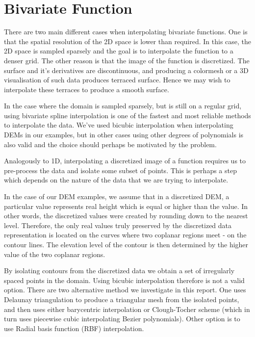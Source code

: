 \documentclass[a4paper,10pt]{report}
\begin{document}
\section{Bivariate Function}
There are two main different cases when interpolating bivariate functions. One is that the spatial resolution of the 2D space is lower than required. In this case, the 2D space is sampled sparsely and the goal is to interpolate the function to a denser grid. The other reason is that the image of the function is discretized. The surface and it's derivatives are discontinuous, and producing a colormesh or a 3D visualisation of such data produces terraced surface. Hence we may wish to interpolate these terraces to produce a smooth surface.


In the case where the domain is sampled sparsely, but is still on a regular grid, using bivariate spline interpolation is one of the fastest and most reliable methods to interpolate the data. We've used bicubic interpolation when interpolating DEMs in our examples, but in other cases using other degrees of polynomials is also valid and the choice should perhaps be motivated by the problem.

Analogously to 1D, interpolating a discretized image of a function requires us to pre-process the data and isolate some subset of points. This is perhaps a step which depends on the nature of the data that we are trying to interpolate.

In the case of our  DEM examples, we assume that in a discretized DEM, a particular value represents real height which is equal or higher than the value. In other words, the discretized values were created by rounding down to the nearest level. Therefore, the only real values truly preserved by the discretized data representation is located on the curves where two coplanar regions meet - on the contour lines. The elevation level of the contour is then determined by the higher value of the two coplanar regions.

By isolating contours from the discretized data we obtain a set of irregularly spaced points in the domain. Using bicubic interpolation therefore is not a valid option. There are two alternative method we investigate in this report. One uses Delaunay triangulation to produce a triangular mesh from the isolated points, and then uses either barycentric interpolation or Clough-Tocher scheme (which in turn uses piecewise cubic interpolating Bezier polynomials). Other option is to use Radial basis function (RBF) interpolation.
\end{document}
